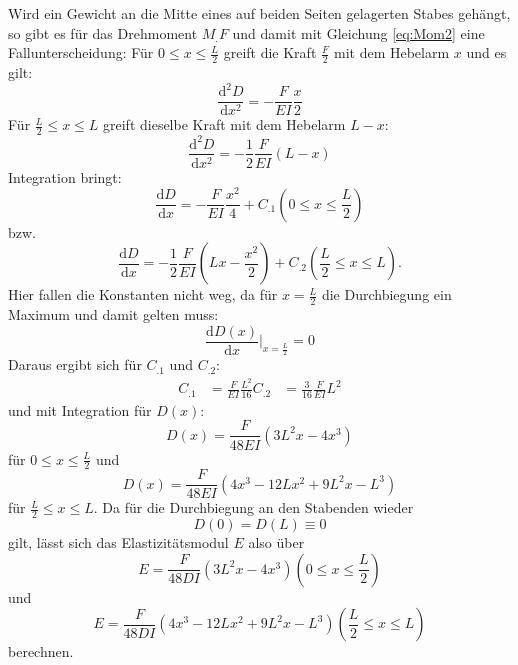 Wird ein Gewicht an die Mitte eines auf beiden Seiten gelagerten Stabes gehängt, so gibt es für das Drehmoment $M_.F$ und damit mit Gleichung \eqref{eq:Mom2} eine Fallunterscheidung:
Für $0 \leq x \leq \frac{L}{2}$ greift die Kraft $\frac{F}{2}$ mit dem Hebelarm $x$ und es gilt:
\[
\frac{\mathrm{d}^2D}{\mathrm{d}x^2} = -\frac{F}{E I}\frac{x}{2}
\]
Für $\frac{L}{2} \leq x \leq L$ greift dieselbe Kraft mit dem Hebelarm $L-x$:
\[
\frac{\mathrm{d}^2D}{\mathrm{d}x^2} = -\frac{1}{2}\frac{F}{E I} (L-x)
\]
Integration bringt:
\[
\frac{\mathrm{d}D}{\mathrm{d}x} = -\frac{F}{E I}\frac{x^2}{4} + C_.1  \left(0 \leq x \leq \frac{L}{2}\right)
\]
bzw.
\[
\frac{\mathrm{d}D}{\mathrm{d}x} = -\frac{1}{2}\frac{F}{E I}\left(L x - \frac{x^2}{2}\right) + C_.2  \left(\frac{L}{2} \leq x \leq L\right) \text{.}
\]
Hier fallen die Konstanten nicht weg, da für $x = \frac{L}{2}$ die Durchbiegung ein Maximum und damit gelten muss:
\[
\frac{\mathrm{d}D(x)}{\mathrm{d}x}|_{x = \frac{L}{2}} = 0
\]
Daraus ergibt sich für $C_.1$ und $C_.2$:
\begin{align*}
C_.1 &= \frac{F}{E I}\frac{L^2}{16}
C_.2 &= \frac{3}{16}\frac{F}{E I} L^2
\end{align*}
und mit Integration für $D(x)$:
\begin{equation*}
D(x) = \frac{F}{48 E I}\left(3 L^2 x - 4 x^3\right)
\end{equation*}
für $0 \leq x \leq \frac{L}{2}$ und
\begin{equation*}
D(x) = \frac{F}{48 E I}\left(4 x^3 - 12 L x^2 + 9 L^2 x - L^3\right)
\end{equation*}
für $\frac{L}{2} \leq x \leq L$.
Da für die Durchbiegung an den Stabenden wieder \[D(0)=D(L)\equiv 0 \] gilt, lässt sich das Elastizitätsmodul $E$ also über
\begin{equation}
E = \frac{F}{48 D I}\left(3 L^2 x - 4 x^3\right)   \left(0 \leq x \leq \frac{L}{2}\right) \label{eq:E2}
\end{equation}
und
\begin{equation}
E = \frac{F}{48 D I}\left(4 x^3 - 12 L x^2 + 9 L^2 x - L^3\right)  \left(\frac{L}{2} \leq x \leq L\right) \label{eq:E3}
\end{equation}
berechnen.
